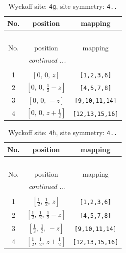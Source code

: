\documentclass[fleqn,8pt]{jsarticle}
\begin{document}
\renewcommand{\arraystretch}{1.2}
\begin{longtable}{ccc}
\caption{Wyckoff site: {\tt 4g}, site symmetry: {\tt 4..}}
 \\
 \hline \hline
No. & position & mapping \\ \hline \endfirsthead

\multicolumn{2}{l}{\tablename\ \thetable{}} \\
 \hline \hline
No. & position & mapping \\ \hline \endhead

 \hline \hline
\multicolumn{2}{r}{\footnotesize\it continued ...} \\ \endfoot

 \hline \hline
\multicolumn{2}{r}{} \\ \endlastfoot

1 & $\left[ 0,\, 0,\, z \right]$ & {\tt [1,2,3,6]} \\ \hline
2 & $\left[ 0,\, 0,\, \frac{1}{2} - z \right]$ & {\tt [4,5,7,8]} \\ \hline
3 & $\left[ 0,\, 0,\, - z \right]$ & {\tt [9,10,11,14]} \\ \hline
4 & $\left[ 0,\, 0,\, z + \frac{1}{2} \right]$ & {\tt [12,13,15,16]} \\
\end{longtable}
\renewcommand{\arraystretch}{1.2}
\begin{longtable}{ccc}
\caption{Wyckoff site: {\tt 4h}, site symmetry: {\tt 4..}}
 \\
 \hline \hline
No. & position & mapping \\ \hline \endfirsthead

\multicolumn{2}{l}{\tablename\ \thetable{}} \\
 \hline \hline
No. & position & mapping \\ \hline \endhead

 \hline \hline
\multicolumn{2}{r}{\footnotesize\it continued ...} \\ \endfoot

 \hline \hline
\multicolumn{2}{r}{} \\ \endlastfoot

1 & $\left[ \frac{1}{2},\, \frac{1}{2},\, z \right]$ & {\tt [1,2,3,6]} \\ \hline
2 & $\left[ \frac{1}{2},\, \frac{1}{2},\, \frac{1}{2} - z \right]$ & {\tt [4,5,7,8]} \\ \hline
3 & $\left[ \frac{1}{2},\, \frac{1}{2},\, - z \right]$ & {\tt [9,10,11,14]} \\ \hline
4 & $\left[ \frac{1}{2},\, \frac{1}{2},\, z + \frac{1}{2} \right]$ & {\tt [12,13,15,16]} \\
\end{longtable}
\end{document}
